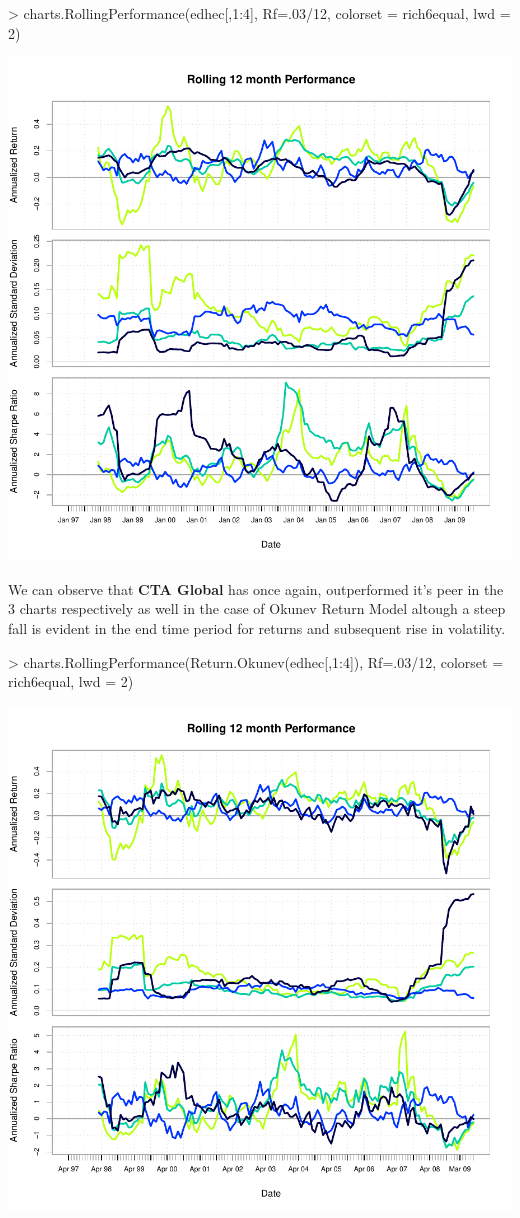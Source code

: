\documentclass[12pt,letterpaper,english]{article}
\begin{document}
\begin{Schunk}
\begin{Sinput}
> charts.RollingPerformance(edhec[,1:4], Rf=.03/12, colorset = rich6equal, lwd = 2)
\end{Sinput}
\end{Schunk}
\includegraphics{UnSmoothReturnAnalysis-Graph5}


We can observe that \textbf{CTA Global} has once again, outperformed it's peer in the 3 charts respectively as well in the case of Okunev Return Model altough a steep fall is evident in the end time period for returns and subsequent rise in volatility.

\begin{Schunk}
\begin{Sinput}
> charts.RollingPerformance(Return.Okunev(edhec[,1:4]), Rf=.03/12, colorset = rich6equal, lwd = 2)
\end{Sinput}
\end{Schunk}
\includegraphics{UnSmoothReturnAnalysis-Graph6}
\end{document}

